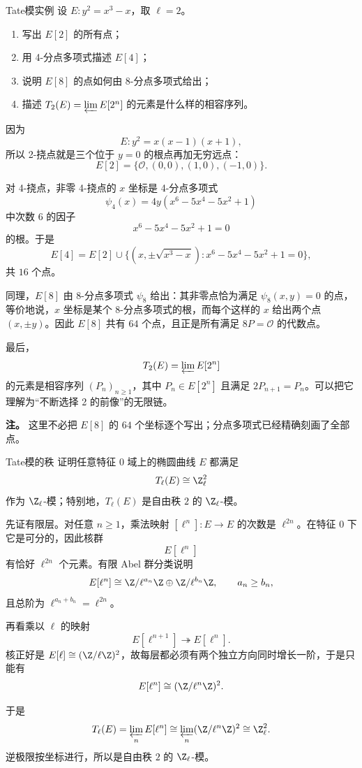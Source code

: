 \begin{problem}{Tate模实例}
设 $E:y^2=x^3-x$，取 $\ell=2$。
\begin{enumerate}[label=(\arabic*)]
  \item 写出 $E[2]$ 的所有点；
  \item 用 4-分点多项式描述 $E[4]$；
  \item 说明 $E[8]$ 的点如何由 8-分点多项式给出；
  \item 描述 $T_2(E)=\varprojlim E[2^n]$ 的元素是什么样的相容序列。
\end{enumerate}
\end{problem}
\begin{solution}
因为
\[
E:y^2=x(x-1)(x+1),
\]
所以 2-挠点就是三个位于 $y=0$ 的根点再加无穷远点：
\[
E[2]=\{\mathcal O,(0,0),(1,0),(-1,0)\}.
\]

对 4-挠点，非零 4-挠点的 $x$ 坐标是 4-分点多项式
\[
\psi_4(x)=4y(x^6-5x^4-5x^2+1)
\]
中次数 $6$ 的因子
\[
x^6-5x^4-5x^2+1=0
\]
的根。于是
\[
E[4]=E[2]\cup\{(x,\pm\sqrt{x^3-x}):x^6-5x^4-5x^2+1=0\},
\]
共 $16$ 个点。

同理，$E[8]$ 由 8-分点多项式 $\psi_8$ 给出：其非零点恰为满足 $\psi_8(x,y)=0$ 的点，等价地说，$x$ 坐标是某个 8-分点多项式的根，而每个这样的 $x$ 给出两个点 $(x,\pm y)$。因此 $E[8]$ 共有 $64$ 个点，且正是所有满足 $8P=\mathcal O$ 的代数点。

最后，
\[
T_2(E)=\varprojlim E[2^n]
\]
的元素是相容序列 $(P_n)_{n\ge1}$，其中 $P_n\in E[2^n]$ 且满足 $2P_{n+1}=P_n$。可以把它理解为“不断选择 2 的前像”的无限链。

\textbf{注。} 这里不必把 $E[8]$ 的 $64$ 个坐标逐个写出；分点多项式已经精确刻画了全部点。
\end{solution}

\begin{problem}{Tate模的秩}
证明任意特征 $0$ 域上的椭圆曲线 $E$ 都满足
\[
T_\ell(E)\cong \Z_\ell^2
\]
作为 $\Z_\ell$-模；特别地，$T_\ell(E)$ 是自由秩 $2$ 的 $\Z_\ell$-模。
\end{problem}
\begin{solution}
先证有限层。对任意 $n\ge1$，乘法映射 $[\ell^n]:E\to E$ 的次数是 $\ell^{2n}$。在特征 $0$ 下它是可分的，因此核群
\[
E[\ell^n]
\]
有恰好 $\ell^{2n}$ 个元素。有限 Abel 群分类说明
\[
E[\ell^n]\cong \Z/\ell^{a_n}\Z\oplus \Z/\ell^{b_n}\Z,
\qquad a_n\ge b_n,
\]
且总阶为 $\ell^{a_n+b_n}=\ell^{2n}$。

再看乘以 $\ell$ 的映射
\[
E[\ell^{n+1}]\twoheadrightarrow E[\ell^n].
\]
核正好是 $E[\ell]\cong (\Z/\ell\Z)^2$，故每层都必须有两个独立方向同时增长一阶，于是只能有
\[
E[\ell^n]\cong (\Z/\ell^n\Z)^2.
\]

于是
\[
T_\ell(E)=\varprojlim_n E[\ell^n]\cong \varprojlim_n (\Z/\ell^n\Z)^2\cong \Z_\ell^2.
\]
逆极限按坐标进行，所以是自由秩 $2$ 的 $\Z_\ell$-模。
\end{solution}

